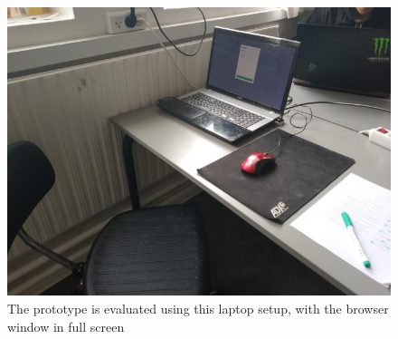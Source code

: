 \begin{figure}[H]
    \centering
    \includegraphics[width=0.75\linewidth]{InteraktionsDesign/Assets/Illustrationer/opstilling.jpg}
    \caption{The prototype is evaluated using this laptop setup, with the browser window in full screen}
    \label{fig:protypesetup}
\end{figure}

